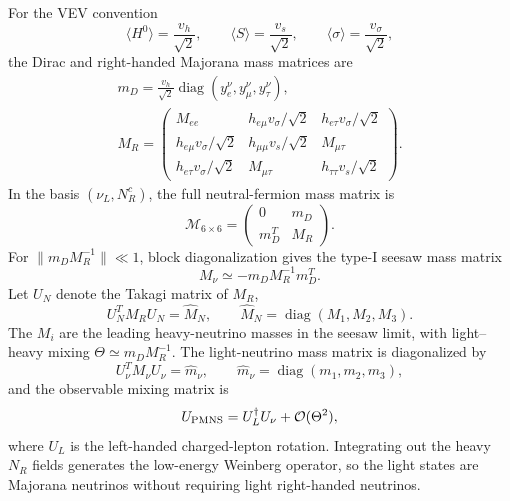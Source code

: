 \documentclass[12pt,a4paper]{article}
\begin{document}
For the VEV convention
\[
\langle H^0\rangle=\frac{v_h}{\sqrt2},\qquad
\langle S\rangle=\frac{v_s}{\sqrt2},\qquad
\langle\sigma\rangle=\frac{v_\sigma}{\sqrt2},
\]
the Dirac and right-handed Majorana mass matrices are
\begin{equation}\label{eq:reply-neutrino-matrices}
\begin{gathered}
m_D=\frac{v_h}{\sqrt2}
\operatorname{diag}(y_e^\nu,y_\mu^\nu,y_\tau^\nu),\\[3pt]
M_R=
\begin{pmatrix}
M_{ee}&h_{e\mu}v_\sigma/\sqrt2&h_{e\tau}v_\sigma/\sqrt2\\
h_{e\mu}v_\sigma/\sqrt2&h_{\mu\mu}v_s/\sqrt2&M_{\mu\tau}\\
h_{e\tau}v_\sigma/\sqrt2&M_{\mu\tau}&h_{\tau\tau}v_s/\sqrt2
\end{pmatrix}.
\end{gathered}
\end{equation}
In the basis \((\nu_L,N_R^c)\), the full neutral-fermion mass matrix is
\begin{equation}\label{eq:reply-neutrino-full-matrix}
\mathcal M_{6\times6}=
\begin{pmatrix}
0&m_D\\
m_D^T&M_R
\end{pmatrix}.
\end{equation}
For \(\|m_DM_R^{-1}\|\ll1\), block diagonalization gives the type-I seesaw mass matrix
\begin{equation}\label{eq:reply-neutrino-seesaw}
M_\nu\simeq-m_DM_R^{-1}m_D^T.
\end{equation}
Let \(U_N\) denote the Takagi matrix of \(M_R\),
\[
U_N^T M_R U_N=\widehat M_N,\qquad
\widehat M_N=\operatorname{diag}(M_1,M_2,M_3).
\]
The \(M_i\) are the leading heavy-neutrino masses in the seesaw limit, with light--heavy mixing \(\Theta\simeq m_D M_R^{-1}\). The light-neutrino mass matrix is diagonalized by
\begin{equation}\label{eq:reply-neutrino-diagonalization}
U_\nu^T M_\nu U_\nu
=\widehat m_\nu,\qquad
\widehat m_\nu=\operatorname{diag}(m_1,m_2,m_3),
\end{equation}
and the observable mixing matrix is
\[
U_{\rm PMNS}=U_L^\dagger U_\nu+\mathcal O(\Theta^2),
\]
where \(U_L\) is the left-handed charged-lepton rotation. Integrating out the heavy \(N_R\) fields generates the low-energy Weinberg operator, so the light states are Majorana neutrinos without requiring light right-handed neutrinos.
\end{document}
